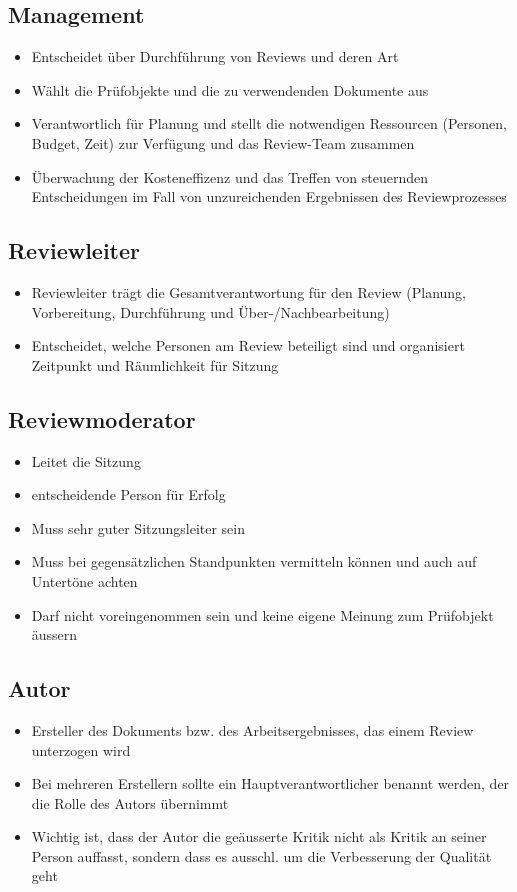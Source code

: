 \documentclass{report}
\theoremstyle{definition}
\theoremstyle{example}
\begin{document}
\subsection{Management}
\begin{itemize}
   \item Entscheidet über Durchführung von Reviews und deren Art
   \item Wählt die Prüfobjekte und die zu verwendenden Dokumente aus
   \item Verantwortlich für Planung und stellt die notwendigen Ressourcen (Personen, Budget, Zeit) zur Verfügung und das Review-Team zusammen
   \item Überwachung der Kosteneffizenz und das Treffen von steuernden Entscheidungen im Fall von unzureichenden Ergebnissen des Reviewprozesses
\end{itemize}

\subsection{Reviewleiter}
\begin{itemize}
   \item Reviewleiter trägt die Gesamtverantwortung für den Review (Planung, Vorbereitung, Durchführung und Über-/Nachbearbeitung)
   \item Entscheidet, welche Personen am Review beteiligt sind und organisiert Zeitpunkt und Räumlichkeit für Sitzung
\end{itemize}

\subsection{Reviewmoderator}
\begin{itemize}
   \item Leitet die Sitzung
   \item entscheidende Person für Erfolg
   \item Muss sehr guter Sitzungsleiter sein
   \item Muss bei gegensätzlichen Standpunkten vermitteln können und auch auf Untertöne achten
   \item Darf nicht voreingenommen sein und keine eigene Meinung zum Prüfobjekt äussern
\end{itemize}

\subsection{Autor}
\begin{itemize}
   \item Ersteller des Dokuments bzw. des Arbeitsergebnisses, das einem Review unterzogen wird
   \item Bei mehreren Erstellern sollte ein Hauptverantwortlicher benannt werden, der die Rolle des Autors übernimmt
   \item Wichtig ist, dass der Autor die geäusserte Kritik nicht als Kritik an seiner Person auffasst, sondern dass es ausschl. um die Verbesserung der Qualität geht
\end{itemize}
\end{document}
